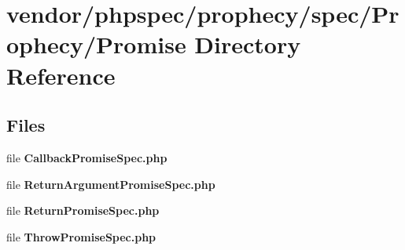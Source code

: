 \section{vendor/phpspec/prophecy/spec/\+Prophecy/\+Promise Directory Reference}
\label{dir_50820d13c7f779336f719567b911fe38}
\subsection*{Files}
\begin{DoxyCompactItemize}
\item 
file {\bf Callback\+Promise\+Spec.\+php}
\item 
file {\bf Return\+Argument\+Promise\+Spec.\+php}
\item 
file {\bf Return\+Promise\+Spec.\+php}
\item 
file {\bf Throw\+Promise\+Spec.\+php}
\end{DoxyCompactItemize}
